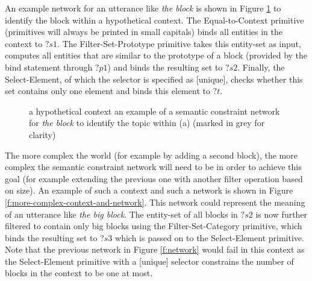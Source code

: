 An example network for an utterance like \textit{the block} is shown in
Figure \ref{f:context-and-network} to identify the block within a
hypothetical context. The {\sc Equal-to-Context} primitive (primitives
will always be printed in small capitals) binds all entities in the
context to $?s1$. The {\sc Filter-Set-Proto\-type} primitive takes
this entity-set as input, computes all entities that are similar to
the prototype of a block (provided by the bind statement through $?p1$)
and binds the resulting set to $?s2$. Finally, the {\sc
  Select-Element}, of which the selector is specified as [unique],
checks whether this set contains only one element and binds this
element to $?t$.

\begin{figure}
\centering
{}
\caption[Example semantic constraint network for \textit{the block}]{ a hypothetical context 
  an example of a semantic constraint network for \textit{the block} to
  identify the topic within (a) (marked in grey for clarity)}
\label{f:context-and-network}
\end{figure}

The more complex the world (for example by adding a second block), the
more complex the semantic constraint network will need to be in order
to achieve this goal (for example extending the previous one with
another filter operation based on size). An example of such a context
and such a network is shown in Figure
\ref{f:more-complex-context-and-network}. This network could represent
the meaning of an utterance like \textit{the big block}. The entity-set of
all blocks in $?s2$ is now further filtered to contain only big blocks
using the {\sc Filter-Set-Category} primitive, which binds the
resulting set to $?s3$ which is passed on to the {\sc Select-Element}
primitive. Note that the previous network in Figure \ref{f:network}
would fail in this context as the {\sc Select-Element} primitive with
a [unique] selector constrains the number of blocks in the context to
be one at most.

